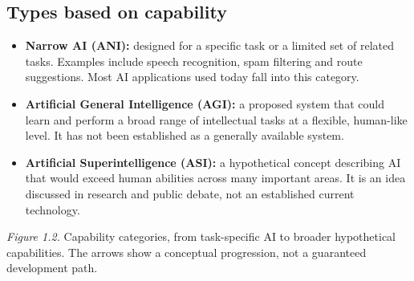 \documentclass[11pt,openany,oneside]{book}
\newcommand{\keyterm}[1]{\textbf{\color{Navy}#1}}
\begin{document}
\subsection{Types based on capability}
\begin{itemize}
\item \keyterm{Narrow AI (ANI):} designed for a specific task or a limited set of related tasks. Examples include speech recognition, spam filtering and route suggestions. Most AI applications used today fall into this category.
\item \keyterm{Artificial General Intelligence (AGI):} a proposed system that could learn and perform a broad range of intellectual tasks at a flexible, human-like level. It has not been established as a generally available system.
\item \keyterm{Artificial Superintelligence (ASI):} a hypothetical concept describing AI that would exceed human abilities across many important areas. It is an idea discussed in research and public debate, not an established current technology.
\end{itemize}

\begin{center}
\end{center}
\textit{Figure 1.2.} Capability categories, from task-specific AI to broader hypothetical capabilities. The arrows show a conceptual progression, not a guaranteed development path.
\end{document}

